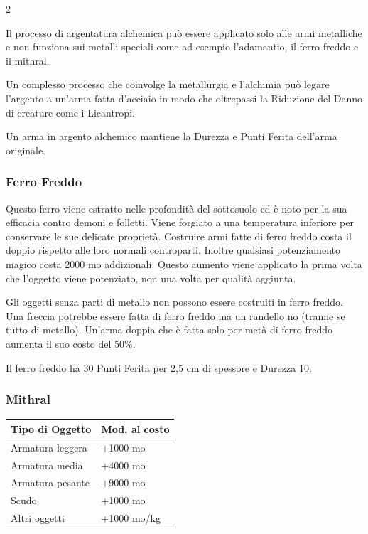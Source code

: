 \begin{multicols}{2}
\medskip

Il processo di argentatura alchemica può essere applicato solo alle armi metalliche e non funziona sui metalli speciali come ad esempio l'adamantio, il ferro freddo e il mithral.

Un complesso processo che coinvolge la metallurgia e l'alchimia può legare l'argento a un'arma fatta d'acciaio in modo che oltrepassi la Riduzione del Danno di creature come i Licantropi.

Un arma in argento alchemico mantiene la Durezza e Punti Ferita dell'arma originale.

\subsubsection{Ferro Freddo}

\label{ferro-freddo}

Questo ferro viene estratto nelle profondità del sottosuolo ed è noto per la sua efficacia contro demoni e folletti. Viene forgiato a una temperatura inferiore per conservare le sue delicate proprietà. Costruire armi fatte di ferro freddo costa il doppio rispetto alle loro normali controparti. Inoltre qualsiasi potenziamento magico costa 2000 mo addizionali. Questo aumento viene applicato la prima volta che l'oggetto viene potenziato, non una volta per qualità aggiunta.

Gli oggetti senza parti di metallo non possono essere costruiti in ferro freddo. Una freccia potrebbe essere fatta di ferro freddo ma un randello no (tranne se tutto di metallo). Un'arma doppia che è fatta solo per metà di ferro freddo aumenta il suo costo del 50\%.

Il ferro freddo ha 30 Punti Ferita per 2,5 cm di spessore e Durezza 10.

\subsubsection{Mithral}

\label{mithral}

\noindent\begin{tabularx}{\linewidth}{Xl}
	\toprule
\rowcolor{gray!20}\textbf{Tipo di Oggetto} & \textbf{Mod. al costo}\\
\toprule
Armatura leggera & +1000 mo\\
\rowcolor{gray!20}Armatura media & +4000 mo\\
Armatura pesante & +9000 mo\\
\rowcolor{gray!20}Scudo & +1000 mo\\
Altri oggetti & +1000 mo/kg
\end{tabularx}


\end{multicols}
